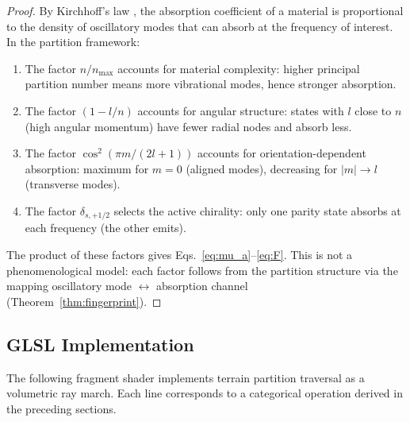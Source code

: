 \documentclass[10pt,twocolumn]{article}
\theoremstyle{definition}
\theoremstyle{remark}
\begin{document}
\begin{proof}
By Kirchhoff's law \citep{Kirchhoff1860}, the absorption
coefficient of a material is proportional to the density of
oscillatory modes that can absorb at the frequency of interest.
In the partition framework:
\begin{enumerate}[leftmargin=*,itemsep=2pt]
\item The factor $n/n_{\max}$ accounts for material complexity:
  higher principal partition number means more vibrational modes,
  hence stronger absorption.
\item The factor $(1-l/n)$ accounts for angular structure:
  states with $l$ close to $n$ (high angular momentum) have
  fewer radial nodes and absorb less.
\item The factor $\cos^2(\pi m/(2l+1))$ accounts for
  orientation-dependent absorption: maximum for $m=0$ (aligned
  modes), decreasing for $|m|\to l$ (transverse modes).
\item The factor $\delta_{s,+1/2}$ selects the active chirality:
  only one parity state absorbs at each frequency (the other
  emits).
\end{enumerate}
The product of these factors gives Eqs.~\eqref{eq:mu_a}--\eqref{eq:F}.  This is not a phenomenological model: each factor
follows from the partition structure via the mapping
oscillatory mode $\leftrightarrow$ absorption channel
(Theorem~\ref{thm:fingerprint}).
\end{proof}

\subsection{GLSL Implementation}\label{sec:glsl}

The following fragment shader implements terrain partition
traversal as a volumetric ray march.  Each line corresponds to
a categorical operation derived in the preceding sections.
\end{document}

